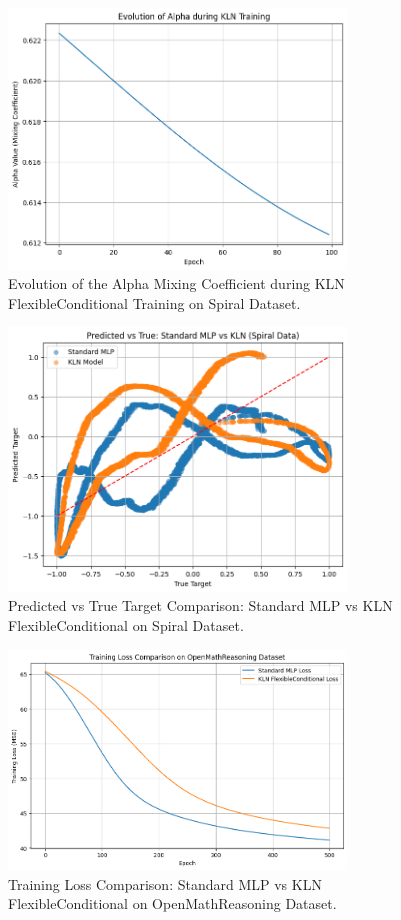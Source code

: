 \documentclass[11pt]{article}
\begin{document}
\begin{figure}[h]
\centering
\includegraphics[width=0.8\textwidth]{figures/spiral_alpha_evolution.png}
\caption{Evolution of the Alpha Mixing Coefficient during KLN FlexibleConditional Training on Spiral Dataset.}
\label{fig:spiral_alpha}
\end{figure}

\begin{figure}[h]
\centering
\includegraphics[width=0.8\textwidth]{figures/spiral_predicted_vs_true.png}
\caption{Predicted vs True Target Comparison: Standard MLP vs KLN FlexibleConditional on Spiral Dataset.}
\label{fig:spiral_predicted}
\end{figure}

\begin{figure}[h]
\centering
\includegraphics[width=0.8\textwidth]{figures/openmath_training_loss.png}
\caption{Training Loss Comparison: Standard MLP vs KLN FlexibleConditional on OpenMathReasoning Dataset.}
\label{fig:openmath_loss}
\end{figure}
\end{document}
